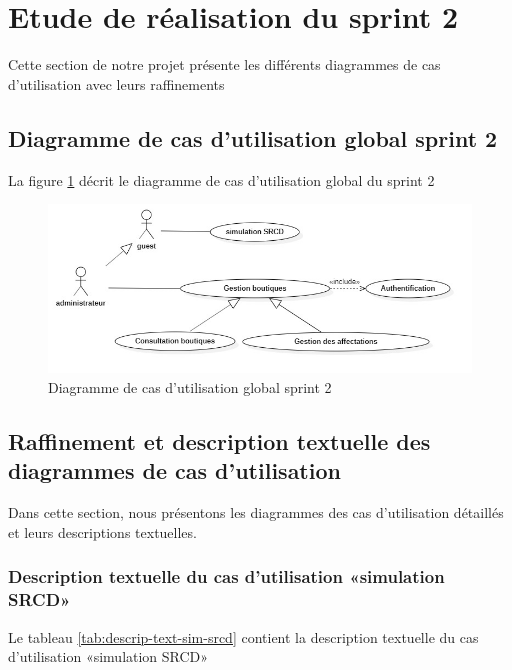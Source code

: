 \section{Etude de réalisation du sprint 2}
Cette section de notre projet présente les différents diagrammes de cas d’utilisation avec leurs raffinements
\newpage
\subsection{Diagramme de cas d’utilisation global sprint 2}
La figure \ref{fig:usecase-sprint2} décrit le diagramme de cas d’utilisation global du sprint 2
\begin{figure}[H]
	\centering
	\includegraphics[width=0.75\linewidth]{"img/conception/usecases/sprint 2/UseCase-sprint2"}
	\caption[Diagramme de cas d’utilisation global sprint 2]{Diagramme de cas d’utilisation global sprint 2}
	\label{fig:usecase-sprint2}
\end{figure}
\subsection{Raffinement et description textuelle des diagrammes de cas d’utilisation}
Dans cette section, nous présentons les diagrammes des cas d’utilisation détaillés et leurs descriptions textuelles.
\subsubsection{Description textuelle du cas d’utilisation «simulation SRCD»}
Le tableau \ref{tab:descrip-text-sim-srcd} contient la description textuelle du cas d’utilisation «simulation SRCD»

